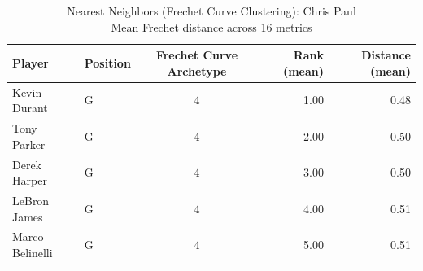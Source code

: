 \begin{table}[t]
\caption*{
{\fontsize{20}{25} Nearest Neighbors (Frechet Curve Clustering): Chris Paul\fontsize{12}{15}\selectfont } \\ 
{\fontsize{14}{17}\selectfont  Mean Frechet distance across 16 metrics\fontsize{12}{15}\selectfont }
} 
\fontsize{12.0pt}{14.0pt}\selectfont
\begin{tabular*}{\linewidth}{@{\extracolsep{\fill}}llcrr}
\toprule
Player & Position & Frechet Curve Archetype & Rank (mean) & Distance (mean) \\ 
\midrule\addlinespace[2.5pt]
Kevin Durant & G & 4 & 1.00 & 0.48 \\ 
Tony Parker & G & 4 & 2.00 & 0.50 \\ 
Derek Harper & G & 4 & 3.00 & 0.50 \\ 
LeBron James & G & 4 & 4.00 & 0.51 \\ 
Marco Belinelli & G & 4 & 5.00 & 0.51 \\ 
\bottomrule
\end{tabular*}
\end{table}

